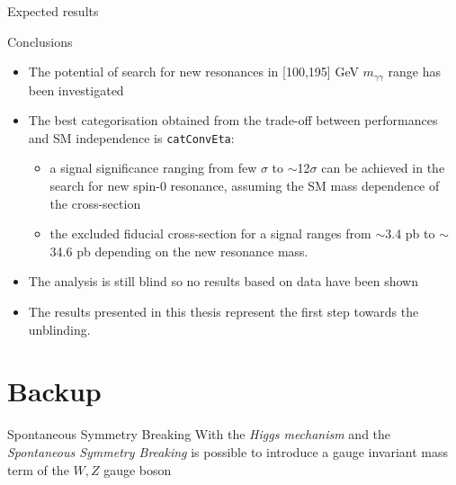 \documentclass[10pt,UKenglish, leqno, xcolor = dvipsnames]{beamer}
\begin{document}
\begin{frame}{Expected results}
\begin{textblock}{1}
			\begin{figure}
			\end{figure}
		\end{textblock}
	\end{frame}

	\begin{frame}{Conclusions}
		\vfill
		\begin{itemize}
			\item The potential of search for new resonances in [100,195] GeV $m_{\gamma\gamma}$ range has been investigated
			\item The best categorisation obtained from the trade-off between performances and SM independence is \texttt{catConvEta}:
			\begin{itemize}
				\item a signal significance ranging from few $\sigma$ to $\sim$12$\sigma$ can be achieved in the search for new spin-0 resonance, assuming the SM mass dependence of the cross-section
				\item the excluded fiducial cross-section for a signal ranges from $\sim$3.4 pb to $\sim$34.6 pb depending on the new resonance mass.
			\end{itemize}
			\item The analysis is still blind so no results based on data have been shown
			\item The results presented in this thesis represent the first step towards the unblinding.
		\end{itemize} 
		\vfill
	\end{frame}

	\section{Backup}
	\SectionPage
		
		\begin{frame}{Spontaneous Symmetry Breaking}
			With the \textit{Higgs mechanism} and the \textit{Spontaneous Symmetry Breaking} is possible to introduce a gauge invariant mass term of the $W,Z$ gauge boson
		\end{frame}
	
\end{document}
